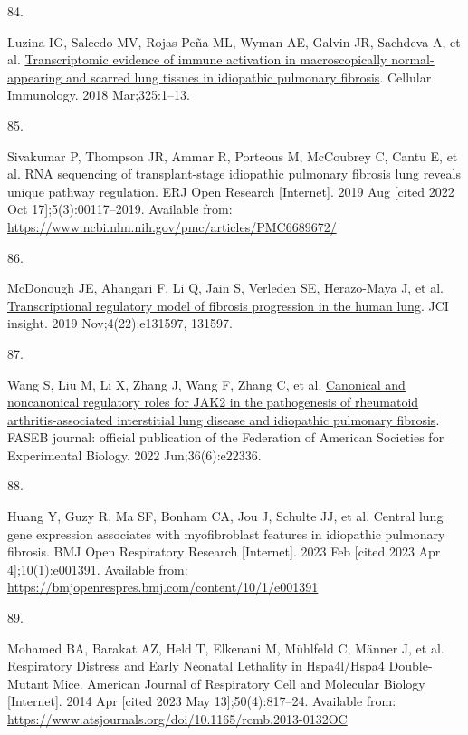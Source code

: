 \documentclass[
]{article}
\newlength{\cslhangindent}
\newlength{\csllabelwidth}
\newenvironment{CSLReferences}[2] %
 {\begin{list}{}{%
  \setlength{\itemindent}{0pt}
  \setlength{\leftmargin}{0pt}
  \setlength{\parsep}{0pt}
  \ifodd #1
   \setlength{\leftmargin}{\cslhangindent}
   \setlength{\itemindent}{-1\cslhangindent}
  \fi
  \setlength{\itemsep}{#2\baselineskip}}}
 {\end{list}}
\newcommand{\CSLLeftMargin}[1]{\parbox[t]{\csllabelwidth}{\strut#1\strut}}
\newcommand{\CSLRightInline}[1]{\parbox[t]{\linewidth - \csllabelwidth}{\strut#1\strut}}
\begin{document}
\begin{CSLReferences}{0}{1}
\CSLLeftMargin{84. }%
\CSLRightInline{Luzina IG, Salcedo MV, Rojas-Peña ML, Wyman AE, Galvin JR, Sachdeva A, et al. \href{https://doi.org/10.1016/j.cellimm.2018.01.002}{Transcriptomic evidence of immune activation in macroscopically normal-appearing and scarred lung tissues in idiopathic pulmonary fibrosis}. Cellular Immunology. 2018 Mar;325:1--13. }

\CSLLeftMargin{85. }%
\CSLRightInline{Sivakumar P, Thompson JR, Ammar R, Porteous M, McCoubrey C, Cantu E, et al. {RNA} sequencing of transplant-stage idiopathic pulmonary fibrosis lung reveals unique pathway regulation. ERJ Open Research {[}Internet{]}. 2019 Aug {[}cited 2022 Oct 17{]};5(3):00117--2019. Available from: \url{https://www.ncbi.nlm.nih.gov/pmc/articles/PMC6689672/}}

\CSLLeftMargin{86. }%
\CSLRightInline{McDonough JE, Ahangari F, Li Q, Jain S, Verleden SE, Herazo-Maya J, et al. \href{https://doi.org/10.1172/jci.insight.131597}{Transcriptional regulatory model of fibrosis progression in the human lung}. JCI insight. 2019 Nov;4(22):e131597, 131597. }

\CSLLeftMargin{87. }%
\CSLRightInline{Wang S, Liu M, Li X, Zhang J, Wang F, Zhang C, et al. \href{https://doi.org/10.1096/fj.202101436R}{Canonical and noncanonical regulatory roles for {JAK2} in the pathogenesis of rheumatoid arthritis-associated interstitial lung disease and idiopathic pulmonary fibrosis}. FASEB journal: official publication of the Federation of American Societies for Experimental Biology. 2022 Jun;36(6):e22336. }

\CSLLeftMargin{88. }%
\CSLRightInline{Huang Y, Guzy R, Ma SF, Bonham CA, Jou J, Schulte JJ, et al. Central lung gene expression associates with myofibroblast features in idiopathic pulmonary fibrosis. BMJ Open Respiratory Research {[}Internet{]}. 2023 Feb {[}cited 2023 Apr 4{]};10(1):e001391. Available from: \url{https://bmjopenrespres.bmj.com/content/10/1/e001391}}

\CSLLeftMargin{89. }%
\CSLRightInline{Mohamed BA, Barakat AZ, Held T, Elkenani M, Mühlfeld C, Männer J, et al. Respiratory {Distress} and {Early} {Neonatal} {Lethality} in {Hspa4l}/{Hspa4} {Double}-{Mutant} {Mice}. American Journal of Respiratory Cell and Molecular Biology {[}Internet{]}. 2014 Apr {[}cited 2023 May 13{]};50(4):817--24. Available from: \url{https://www.atsjournals.org/doi/10.1165/rcmb.2013-0132OC}}


\end{CSLReferences}
\end{document}
